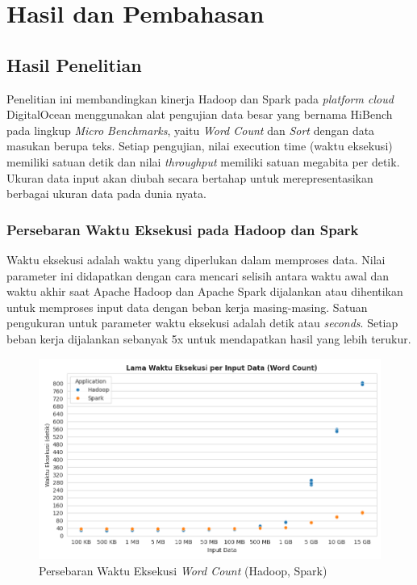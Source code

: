 \chapter{Hasil dan Pembahasan}

\section{Hasil Penelitian}
Penelitian ini membandingkan kinerja Hadoop dan Spark pada \textit{platform cloud} DigitalOcean menggunakan alat pengujian data besar yang bernama HiBench pada lingkup \textit{Micro Benchmarks}, yaitu \textit{Word Count} dan \textit{Sort} dengan data masukan berupa teks.
Setiap pengujian, nilai execution time (waktu eksekusi) memiliki satuan detik dan nilai \textit{throughput} memiliki satuan megabita per detik. Ukuran data input akan diubah secara bertahap untuk merepresentasikan berbagai ukuran data pada dunia nyata.

\subsection {Persebaran Waktu Eksekusi pada Hadoop dan Spark}
Waktu eksekusi adalah waktu yang diperlukan dalam memproses data. Nilai parameter ini didapatkan dengan cara mencari selisih antara waktu awal dan waktu akhir saat Apache Hadoop dan Apache Spark dijalankan atau dihentikan untuk memproses input data dengan beban kerja masing-masing. Satuan pengukuran untuk parameter waktu eksekusi adalah detik atau \textit{seconds}. Setiap beban kerja dijalankan sebanyak 5x untuk mendapatkan hasil yang lebih terukur. 

\begin{figure}[h]
    \centering
    \includegraphics[width=1\textwidth]{figures/ch04/1-lama-waktu-eksekusi-wordcount.png}
    \caption{Persebaran Waktu Eksekusi \textit{Word Count} (Hadoop, Spark)}
    \label{fig:lama-waktu-eksekusi-wordcount}
\end{figure}

